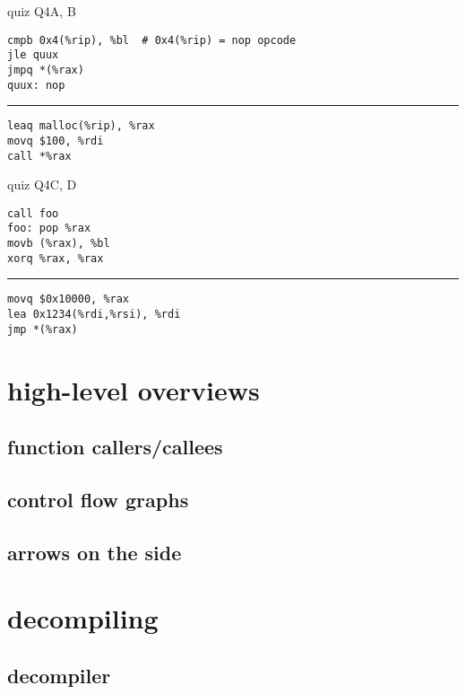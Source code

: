 \begin{frame}[fragile]{quiz Q4A, B}
\begin{Verbatim}[fontsize=\small]
cmpb 0x4(%rip), %bl  # 0x4(%rip) = nop opcode
jle quux
jmpq *(%rax)
quux: nop
\end{Verbatim}
\hrule
\begin{Verbatim}[fontsize=\small]
leaq malloc(%rip), %rax
movq $100, %rdi
call *%rax
\end{Verbatim}
\end{frame}

\begin{frame}[fragile]{quiz Q4C, D}
\begin{Verbatim}[fontsize=\small]
call foo
foo: pop %rax
movb (%rax), %bl
xorq %rax, %rax
\end{Verbatim}
\hrule
\begin{Verbatim}[fontsize=\small]
movq $0x10000, %rax
lea 0x1234(%rdi,%rsi), %rdi
jmp *(%rax)
\end{Verbatim}
\end{frame}

\section{high-level overviews}

\subsection{function callers/callees}

\subsection{control flow graphs}


\subsection{arrows on the side}


\section{decompiling}

\subsection{decompiler}


